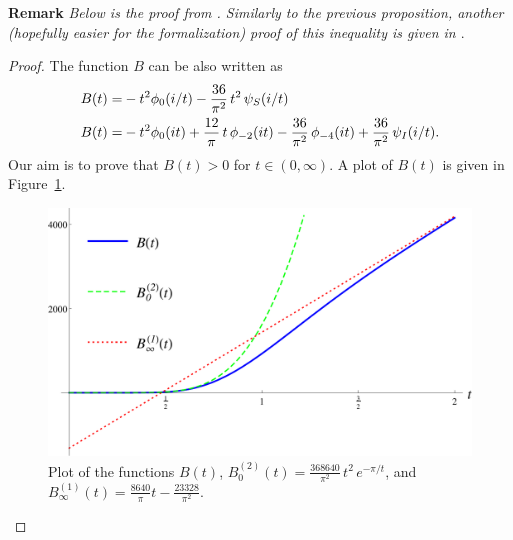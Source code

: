 \noindent\textbf{Remark} \emph{Below is the proof from \cite{Via2017}. Similarly to the previous proposition, another (hopefully easier for the formalization) proof of this inequality is given in \cite{Romik2023}}.
\begin{proof}

The function $B$ can be also written as
\begin{align}
  B(t)=&-t^2\phi_0(i/t)-\frac{36}{\pi^2}\,t^2\,\psi_S(i/t)\notag\\
  B(t)=&-t^2\phi_0(it)+\frac{12}{\pi}\,t\,\phi_{-2}(it)-\frac{36}{\pi^2}\,\phi_{-4}(it)+\frac{36}{\pi^2}\,\psi_I(i/t).\notag
\end{align}
Our aim is to prove that $B(t)>0$ for $t\in(0,\infty)$. A plot of $B(t)$ is given in Figure~\ref{fig:B}.
\begin{figure}[h!]
\caption{Plot of the functions $B(t)$, $B^{(2)}_0(t)=\frac{368640}{\pi^2}\,t^2\,e^{-\pi /t}$, and $B^{(1)}_\infty(t)=\frac{8640}{\pi}t-\frac{23328}{\pi^2}$.\label{fig:B}}
  \centering
\includegraphics[width=300 pt]{graphics/e8plot_B.pdf}
\end{figure}


\end{proof}
